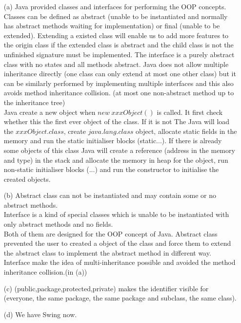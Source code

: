 \documentclass[10pt,twoside,a4paper]{article}
\begin{document}
\begin{enumerate}
\item[(a)]
Java provided classes and interfaces for performing the OOP concepts. Classes can be defined as abstract (unable to be instantiated and normally has abstract methods waiting for implementation) or final (unable to be extended). Extending a existed class will enable us to add more features to the origin class if the extended class is abstract and the child class is not the unfinished signature must be implemented. The interface is a purely abstract class with no states and all methods abstract. Java does not allow multiple inheritance directly (one class can only extend at most one other class) but it can be similarly performed by implementing multiple interfaces and this also avoids method inheritance collision. (at most one non-abstract method up to the inheritance tree)\\
Java create a new object when $new \ xxxObject()$ is called. It first check whether this the first ever object of the class. If it is not The Java will load the $xxxObject.class$, create $java.lang.class$ object, allocate static fields in the memory and run the static initialiser blocks (static{...}). If there is already some objects of this class Java will create a reference (address in the memory and type) in the stack and allocate the memory in heap for the object, run non-static initialiser blocks ({...}) and run the constructor to initialise the created objects.
\item[(b)]
Abstract class can not be instantiated and may contain some or no abstract methods.\\
Interface is a kind of special classes which is unable to be instantiated with only abstract methods and no fields.\\
Both of them are designed for the OOP concept of Java. Abstract class prevented the user to created a object of the class and force them to extend the abstract class to implement the abstract method in different way. Interface make the idea of multi-inheritance possible and avoided the method inheritance collision.(in (a))
\item[(c)]
(public,package,protected,private) makes the identifier visible for (everyone, the same package, the same package and subclass, the same class).
\item[(d)]
We have Swing now.
\end{enumerate}
\end{document}
